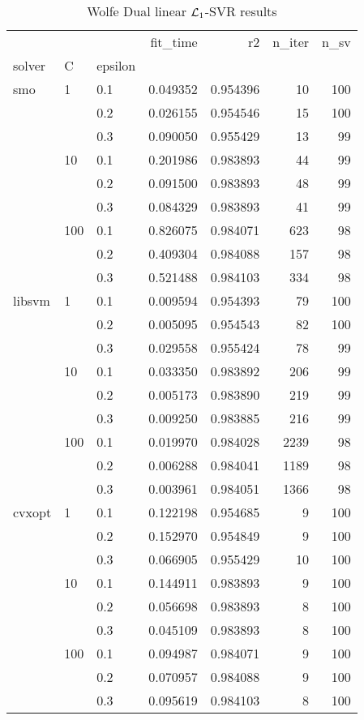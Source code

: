 \begin{table}[H]
\centering
\caption{Wolfe Dual linear $\protect \mathcal{L}_1$-SVR results}
\label{linear_dual_l1_svr_cv_results}
\begin{tabular}{lllrrrr}
\toprule
       &     &     &  fit\_time &        r2 &  n\_iter &  n\_sv \\
solver & C & epsilon &           &           &         &       \\
\midrule
smo & 1   & 0.1 &  0.049352 &  0.954396 &      10 &   100 \\
       &     & 0.2 &  0.026155 &  0.954546 &      15 &   100 \\
       &     & 0.3 &  0.090050 &  0.955429 &      13 &    99 \\
       & 10  & 0.1 &  0.201986 &  0.983893 &      44 &    99 \\
       &     & 0.2 &  0.091500 &  0.983893 &      48 &    99 \\
       &     & 0.3 &  0.084329 &  0.983893 &      41 &    99 \\
       & 100 & 0.1 &  0.826075 &  0.984071 &     623 &    98 \\
       &     & 0.2 &  0.409304 &  0.984088 &     157 &    98 \\
       &     & 0.3 &  0.521488 &  0.984103 &     334 &    98 \\
libsvm & 1   & 0.1 &  0.009594 &  0.954393 &      79 &   100 \\
       &     & 0.2 &  0.005095 &  0.954543 &      82 &   100 \\
       &     & 0.3 &  0.029558 &  0.955424 &      78 &    99 \\
       & 10  & 0.1 &  0.033350 &  0.983892 &     206 &    99 \\
       &     & 0.2 &  0.005173 &  0.983890 &     219 &    99 \\
       &     & 0.3 &  0.009250 &  0.983885 &     216 &    99 \\
       & 100 & 0.1 &  0.019970 &  0.984028 &    2239 &    98 \\
       &     & 0.2 &  0.006288 &  0.984041 &    1189 &    98 \\
       &     & 0.3 &  0.003961 &  0.984051 &    1366 &    98 \\
cvxopt & 1   & 0.1 &  0.122198 &  0.954685 &       9 &   100 \\
       &     & 0.2 &  0.152970 &  0.954849 &       9 &   100 \\
       &     & 0.3 &  0.066905 &  0.955429 &      10 &   100 \\
       & 10  & 0.1 &  0.144911 &  0.983893 &       9 &   100 \\
       &     & 0.2 &  0.056698 &  0.983893 &       8 &   100 \\
       &     & 0.3 &  0.045109 &  0.983893 &       8 &   100 \\
       & 100 & 0.1 &  0.094987 &  0.984071 &       9 &   100 \\
       &     & 0.2 &  0.070957 &  0.984088 &       9 &   100 \\
       &     & 0.3 &  0.095619 &  0.984103 &       8 &   100 \\
\bottomrule
\end{tabular}
\end{table}
